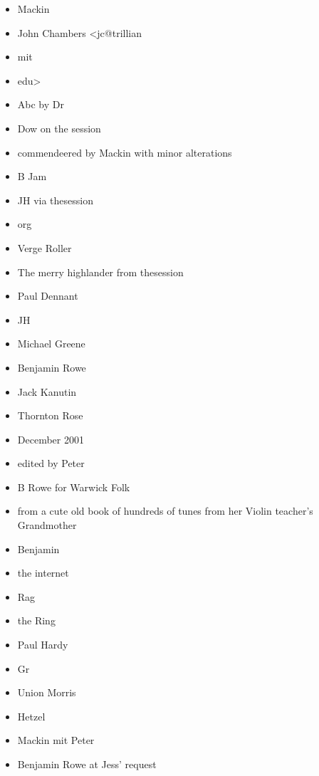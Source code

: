 \documentclass[12pt,a4paper,twoside]{article}
\begin{document}
\begin{multicols}{2}
\begin{itemize}\item Mackin
\item John Chambers <jc@trillian
\item mit
\item edu>
\item Abc by Dr
\item Dow on the session
\item commendeered by Mackin with minor alterations
\item B Jam
\item JH via thesession
\item org
\item Verge Roller
\item The merry highlander from thesession
\item Paul Dennant
\item JH
\item Michael Greene
\item Benjamin Rowe
\item Jack Kanutin
\item Thornton Rose
\item December 2001
\item edited by Peter
\item B Rowe for Warwick Folk
\item from a cute old book of hundreds of tunes from her Violin teacher's Grandmother
\item Benjamin
\item the internet
\item Rag
\item the Ring
\item Paul Hardy
\item Gr
\item Union Morris
\item Hetzel
\item Mackin mit Peter
\item Benjamin Rowe at Jess' request
\end{itemize}

\end{multicols}

\newpage


\end{document}
